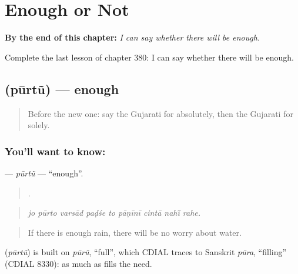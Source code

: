 
\chapter{Enough or Not}
\label{ch:gu-enough-or-not}

\begin{chapteropening}
\textbf{By the end of this chapter:} \emph{I can say whether there will be enough.}

Complete the last lesson of chapter 380: I can say whether there will be enough.
\end{chapteropening}

\section[\texorpdfstring{\gu{પૂરતું} (pūrtũ)}{પૂરતું (pūrtũ)}]{ (pūrtũ) — enough}

\label{lesson:GU-C380-purtu}



\begin{quote}
Before the new one: say the Gujarati for absolutely, then the Gujarati for solely.
\end{quote}

\subsection*{You'll want to know: }
\textbf{} — \emph{pūrtũ} — \textquotedblleft{}enough\textquotedblright{}.

\begin{quote}
        .
\end{quote}

\begin{quote}
\emph{jo pūrto varsād paḍśe to pāṇīnī cintā nahī̃ rahe.}
\end{quote}

\begin{quote}
If there is enough rain, there will be no worry about water.
\end{quote}

\begin{cousinweb}
\textbf{} (\emph{pūrtũ}) is built on \emph{pūrũ}, \textquotedblleft{}full\textquotedblright{}, which CDIAL traces to Sanskrit \emph{pūra}, \textquotedblleft{}filling\textquotedblright{} (CDIAL 8330): as much as fills the need.
\end{cousinweb}

